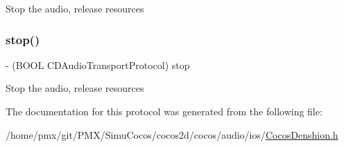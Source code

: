 Stop the audio, release resources \mbox{\label{protocolCDAudioTransportProtocol_01-p_a5a69d110348cf35dd25ade6c86bd4b41}} 
\subsubsection{\texorpdfstring{stop()}{stop()}\hspace{0.1cm}{\footnotesize\ttfamily [4/4]}}
{\footnotesize\ttfamily -\/ (B\+O\+OL C\+D\+Audio\+Transport\+Protocol) stop \begin{DoxyParamCaption}{ }\end{DoxyParamCaption}}

Stop the audio, release resources 

The documentation for this protocol was generated from the following file\+:\begin{DoxyCompactItemize}
\item 
/home/pmx/git/\+P\+M\+X/\+Simu\+Cocos/cocos2d/cocos/audio/ios/\hyperlink{cocos2d_2cocos_2audio_2ios_2CocosDenshion_8h}{Cocos\+Denshion.\+h}\end{DoxyCompactItemize}
